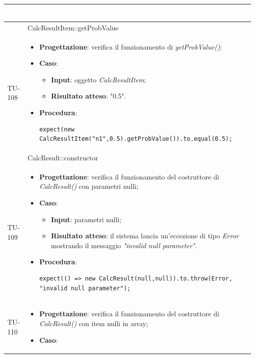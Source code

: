 \begin{longtable}{|C{1.5cm}|C{14.5cm}|}
\begin{itemize}
\begin{lstlisting}
	\end{lstlisting}
\end{itemize}\\
\hline
{} & CalcResultItem::getProbValue
\\ \hline
{TU-108} &
\begin{itemize}
	\item \textbf{Progettazione}: verifica il funzionamento di \emph{getProbValue()};
	\item \textbf{Caso}: 
	\begin{itemize}
		\item \textbf{Input}: oggetto \emph{CalcResultItem};
		\item \textbf{Risultato atteso}: "0.5".
	\end{itemize}
	\item \textbf{Procedura}:
	\begin{lstlisting}
expect(new CalcResultItem("n1",0.5).getProbValue()).to.equal(0.5);
	\end{lstlisting}
\end{itemize}\\
\hline
{} & CalcResult::constructor
\\ \hline
{TU-109} &
\begin{itemize}
	\item \textbf{Progettazione}: verifica il funzionamento del costruttore di \emph{CalcResult()} con parametri nulli;
	\item \textbf{Caso}: 
	\begin{itemize}
		\item \textbf{Input}: parametri nulli;
		\item \textbf{Risultato atteso}: il sistema lancia un'eccezione di tipo \emph{Error} mostrando il messaggio \emph{"invalid null parameter"}.
	\end{itemize}
	\item \textbf{Procedura}:
	\begin{lstlisting}
expect(() => new CalcResult(null,null)).to.throw(Error, "invalid null parameter");
	\end{lstlisting}
\end{itemize}\\
\hline
{TU-110} &
\begin{itemize}
	\item \textbf{Progettazione}: verifica il funzionamento del costruttore di \emph{CalcResult()} con item nulli in array;
	\item \textbf{Caso}: 
	\begin{itemize}

\end{itemize}
\end{itemize}
\end{longtable}
